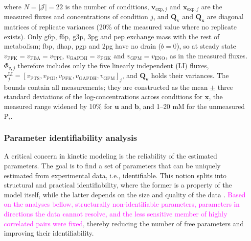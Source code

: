 \documentclass[conference]{IEEEtran}
\begin{document}
{where $N=|\mathcal{J}|=22$ is the number of conditions, $\mathbf{v}_{\text{exp},j}$ and $\mathbf{x}_{\text{exp},j}$ are the measured fluxes and concentrations of condition $j$, and $\mathbf{Q_v}$ and $\mathbf{Q_x}$ are diagonal matrices of replicate variances (20\% of the measured value where no replicate exists). Only g6p, f6p, g3p, 3pg and pep exchange mass with the rest of metabolism; fbp, dhap, pgp and 2pg have no drain ($b=0$), so at steady state $v_{\text{PFK}}=v_{\text{FBA}}=v_{\text{TPI}}$, $v_{\text{GAPDH}}=v_{\text{PGK}}$ and $v_{\text{GPM}}=v_{\text{ENO}}$, as in the measured fluxes. $\Phi_{v,j}$ therefore includes only the five linearly independent (LI) fluxes, $\mathbf{v}^{\text{LI}}_j = [v_{\text{PTS}}, v_{\text{PGI}}, v_{\text{PFK}}, v_{\text{GAPDH}}, v_{\text{GPM}}]_j$, and $\mathbf{Q_v}$ holds their variances. The bounds contain all measurements; they are constructed as the mean $\pm$ three standard deviations of the log-concentrations across conditions for $\mathbf{x}$, the measured range widened by 10\% for $\mathbf{u}$ and $\mathbf{b}$, and 1--20 mM for the unmeasured P$_i$.}

\subsubsection{Parameter identifiability analysis}
A critical concern in kinetic modeling is the reliability of the estimated parameters.
The goal is to find a set of parameters that can be uniquely estimated from experimental data, i.e., identifiable. This notion splits into structural and practical identifiability, where the former is a property of the model itself, while the latter depends on the size and quality of the data \cite{Wieland2021StructuralPracticalIdentifiability}.
\textcolor{magenta}{Based on the analyses bellow, structurally non-identifiable parameters, parameters in directions the data cannot resolve, and the less sensitive member of highly correlated pairs were fixed}, thereby reducing the number of free parameters and improving their identifiability.
\end{document}
